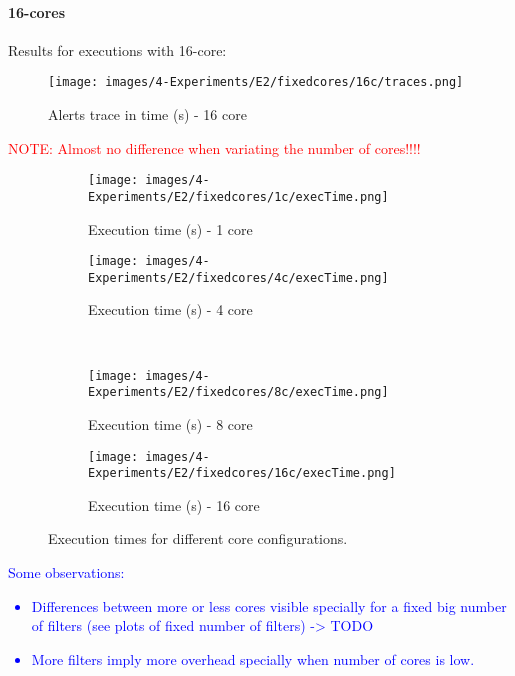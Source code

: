 \paragraph{16-cores\\}

Results for executions with 16-core:

\begin{figure}[H]
  \centering
  \texttt{[image: images/4-Experiments/E2/fixedcores/16c/traces.png]}
  \caption{Alerts trace in time (s) - 16 core}
\end{figure}

\textcolor{red}{NOTE: Almost no difference when variating the number of cores!!!!}

\begin{figure}[H]
  \centering
  \begin{subfigure}[b]{0.45\textwidth}
    \centering
    \texttt{[image: images/4-Experiments/E2/fixedcores/1c/execTime.png]}
    \caption{Execution time (s) - 1 core}
  \end{subfigure}
  \hfill
  \begin{subfigure}[b]{0.45\textwidth}
    \centering
    \texttt{[image: images/4-Experiments/E2/fixedcores/4c/execTime.png]}
    \caption{Execution time (s) - 4 core}
  \end{subfigure}
  \\
  \begin{subfigure}[b]{0.45\textwidth}
    \centering
    \texttt{[image: images/4-Experiments/E2/fixedcores/8c/execTime.png]}
    \caption{Execution time (s) - 8 core}
  \end{subfigure}
  \hfill
  \begin{subfigure}[b]{0.45\textwidth}
    \centering
    \texttt{[image: images/4-Experiments/E2/fixedcores/16c/execTime.png]}
    \caption{Execution time (s) - 16 core}
  \end{subfigure}
  \caption{Execution times for different core configurations.}
  \label{fig:execution-times}
\end{figure}


\textcolor{blue}{
Some observations:
\begin{itemize}
    \item Differences between  more or less cores visible specially for a fixed big number of filters (see plots of fixed number of filters) -> TODO
    \item More filters imply more overhead specially when number of cores is low.
\end{itemize}
}

